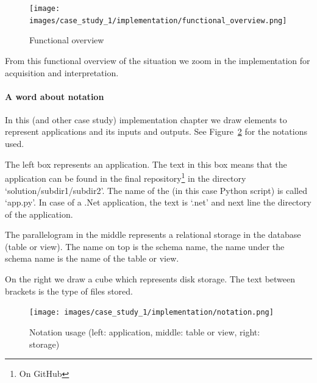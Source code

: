 \documentclass{ou-report}
\begin{document}
\begin{figure}[H]
    \centering
    \texttt{[image: images/case\_study\_1/implementation/functional\_overview.png]}
    \caption{Functional overview}
    \label{fig:functional_overview}
\end{figure}

From this functional overview of the situation we zoom in the implementation
for acquisition and interpretation.

\paragraph{A word about notation}
In this (and other case study) implementation chapter we draw elements to represent
applications and its inputs and outputs. See Figure~\ref{fig:notation} for the 
notations used. 

The left box represents an application. The text in this box means that
the application can be found in the final repository\footnote{On GitHub} 
in the directory `solution/subdir1/subdir2'.
The name of the (in this case Python script) is called `app.py'. In case of a .Net 
application, the text is `.net' and next line the directory of the application.

The parallelogram in the middle represents a relational storage in the database (table or 
view). The name on top is the schema name, the name under the schema name is the name 
of the table or view.

On the right we draw a cube which represents disk storage. The text between brackets
is the type of files stored.

\begin{figure}[H]
    \centering
    \texttt{[image: images/case\_study\_1/implementation/notation.png]}
    \caption{Notation usage (left: application, middle: table or view, right: storage)}
    \label{fig:notation}
\end{figure}




\end{document}

